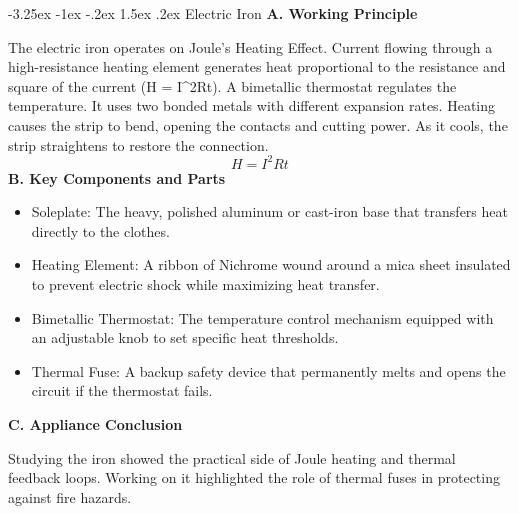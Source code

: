 \documentclass[11pt,a4paper]{report}
\makeatletter
\renewcommand{\section}{\@startsection{section}{1}{\z@}%
  {-3.25ex \@plus -1ex \@minus -.2ex}%
  {1.5ex \@plus.2ex}%
  {\normalfont\Large\bfseries\color{primaryColor}}}
\makeatother
\begin{document}
\section{Electric Iron}
\noindent\textbf{A. Working Principle}\par\medskip
The electric iron operates on Joule's Heating Effect. Current flowing through a high-resistance heating element generates heat proportional to the resistance and square of the current (H = I\textasciicircum{}2Rt). A bimetallic thermostat regulates the temperature. It uses two bonded metals with different expansion rates. Heating causes the strip to bend, opening the contacts and cutting power. As it cools, the strip straightens to restore the connection.
\begin{equation}H = I^2 R t\end{equation}
\noindent\textbf{B. Key Components and Parts}\par\medskip
\begin{itemize}
  \item Soleplate: The heavy, polished aluminum or cast-iron base that transfers heat directly to the clothes.
  \item Heating Element: A ribbon of Nichrome wound around a mica sheet insulated to prevent electric shock while maximizing heat transfer.
  \item Bimetallic Thermostat: The temperature control mechanism equipped with an adjustable knob to set specific heat thresholds.
  \item Thermal Fuse: A backup safety device that permanently melts and opens the circuit if the thermostat fails.
\end{itemize}
\noindent\textbf{C. Appliance Conclusion}\par\medskip
Studying the iron showed the practical side of Joule heating and thermal feedback loops. Working on it highlighted the role of thermal fuses in protecting against fire hazards.
\end{document}

